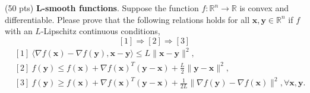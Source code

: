 \item {\color{red} (50 pts)} \textbf{L-smooth functions}. Suppose the function $f: \mathbb{R}^n \rightarrow \mathbb{R}$ is convex and differentiable. Please prove that the following relations holds for all $\mathbf{x}, \mathbf{y} \in \mathbb{R}^n$ if $f$ with an $L$-Lipschitz continuous conditions,
$$[1] \Rightarrow[2] \Rightarrow[3]$$
\begin{align*}
    & [1]\  \langle\nabla f(\mathbf{x})-\nabla f(\mathbf{y}), \mathbf{x}-\mathbf{y}\rangle \leq L\|\mathbf{x}-\mathbf{y}\|^2,\\
    & [2]\  f(\mathbf{y}) \leq f(\mathbf{x})+\nabla f(\mathbf{x})^T(\mathbf{y}-\mathbf{x})+\frac{L}{2}\|\mathbf{y}-\mathbf{x}\|^2,\\
    & [3]\  f(\mathbf{y}) \geq f(\mathbf{x})+\nabla f(\mathbf{x})^T(\mathbf{y}-\mathbf{x})+\frac{1}{2 L}\|\nabla f(\mathbf{y})-\nabla f(\mathbf{x})\|^2, \forall \mathbf{x}, \mathbf{y}.
\end{align*}

